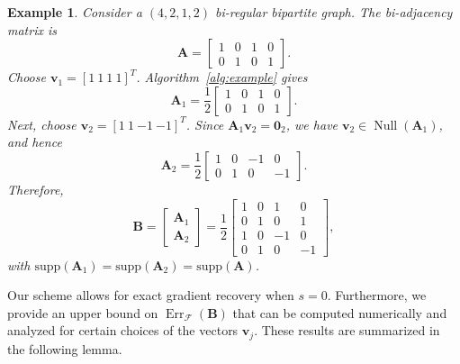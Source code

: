 \documentclass[journal,draftcls,onecolumn]{IEEEtran}
\theoremstyle{mystyle}
\newtheorem{example}{Example}
\newcommand{\bfv}{\mathbf{v}}
\newcommand{\aditya}[1]{\marginpar{+}{\bf Aditya's remark}: {\em #1}}
\begin{document}
\begin{example}
Consider a $(4,2,1,2)$ bi-regular bipartite graph. The bi-adjacency matrix is 
\[
\mathbf{A}=
\begin{bmatrix}
1&0&1&0\\
0&1&0&1
\end{bmatrix}.
\]
Choose $\mathbf{v}_1=[1\ 1\ 1\ 1]^T$. Algorithm~\ref{alg:example} gives
\[
\mathbf{A}_1=\frac{1}{2}
\begin{bmatrix}
1&0&1&0\\
0&1&0&1
\end{bmatrix}.
\]
Next, choose $\mathbf{v}_2=[1\ 1\ {-1}\ {-1}]^T$. Since
$\mathbf{A}_1\mathbf{v}_2=\mathbf{0}_2$, we have
$\mathbf{v}_2\in\operatorname{Null}(\mathbf{A}_1)$, and hence
\[
\mathbf{A}_2=\frac{1}{2}
\begin{bmatrix}
1&0&-1&0\\
0&1&0&-1
\end{bmatrix}.
\]
Therefore,
\[
\mathbf{B}
=
\begin{bmatrix}
\mathbf{A}_1\\
\mathbf{A}_2
\end{bmatrix}
=
\frac{1}{2}
\begin{bmatrix}
1&0&1&0\\
0&1&0&1\\
1&0&-1&0\\
0&1&0&-1
\end{bmatrix},
\]
with
$\text{supp}(\mathbf{A}_1)
=\text{supp}(\mathbf{A}_2)
=\text{supp}(\mathbf{A})$.
\end{example}









Our scheme allows for exact gradient recovery when $s=0$. Furthermore, we provide an upper bound on $\operatorname{Err}_{\mathcal{F}}(\mathbf{B})$ that can be computed numerically and analyzed for certain choices of the vectors $\mathbf{v}_j$. These results are summarized in the following lemma.










\end{document}
